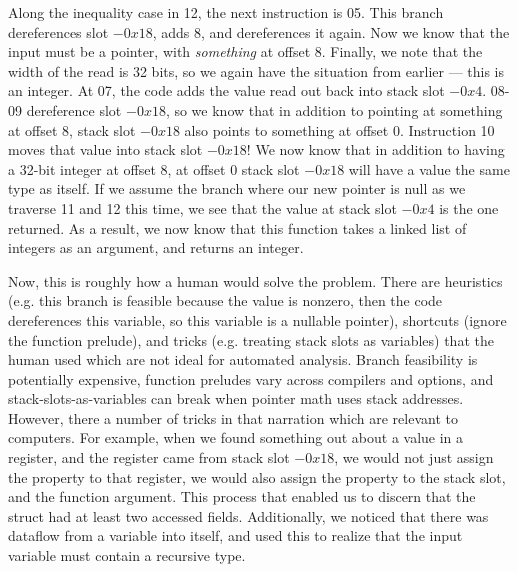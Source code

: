 Along the inequality case in 12, the next instruction is 05. This branch dereferences slot $-0x18$, adds 8, and dereferences it again. Now we know that the input must be a pointer, with \emph{something} at offset 8. Finally, we note that the width of the read is 32 bits, so we again have the situation from earlier --- this is an integer. At 07, the code adds the value read out back into stack slot $-0x4$. 08-09 dereference slot $-0x18$, so we know that in addition to pointing at something at offset 8, stack slot $-0x18$ also points to something at offset 0. Instruction 10 moves that value into stack slot $-0x18$! We now know that in addition to having a 32-bit integer at offset 8, at offset 0 stack slot $-0x18$ will have a value the same type as itself. If we assume the branch where our new pointer is null as we traverse 11 and 12 this time, we see that the value at stack slot $-0x4$ is the one returned. As a result, we now know that this function takes a linked list of integers as an argument, and returns an integer.

Now, this is roughly how a human would solve the problem. There are heuristics (e.g. this branch is feasible because the value is nonzero, then the code dereferences this variable, so this variable is a nullable pointer), shortcuts (ignore the function prelude), and tricks (e.g. treating stack slots as variables) that the human used which are not ideal for automated analysis.
Branch feasibility is potentially expensive, function preludes vary across compilers and options, and stack-slots-as-variables can break when pointer math uses stack addresses.
However, there a number of tricks in that narration which are relevant to computers. For example, when we found something out about a value in a register, and the register came from stack slot $-0x18$, we would not just assign the property to that register, we would also assign the property to the stack slot, and the function argument. This process that enabled us to discern that the struct had at least two accessed fields. Additionally, we noticed that there was dataflow from a variable into itself, and used this to realize that the input variable must contain a recursive type.

